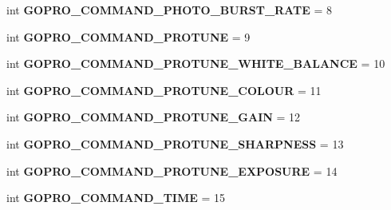 \begin{DoxyCompactItemize}
\item 
\mbox{\label{namespacepymavlink_1_1dialects_1_1v10_a2f48cf9475e0a0918864031cb02472fc}} 
int {\bfseries G\+O\+P\+R\+O\+\_\+\+C\+O\+M\+M\+A\+N\+D\+\_\+\+P\+H\+O\+T\+O\+\_\+\+B\+U\+R\+S\+T\+\_\+\+R\+A\+TE} = 8
\item 
\mbox{\label{namespacepymavlink_1_1dialects_1_1v10_a8d4dc474ba7d4efb758af7cd7c1598aa}} 
int {\bfseries G\+O\+P\+R\+O\+\_\+\+C\+O\+M\+M\+A\+N\+D\+\_\+\+P\+R\+O\+T\+U\+NE} = 9
\item 
\mbox{\label{namespacepymavlink_1_1dialects_1_1v10_af1d0b4e81e42e7d5d51eb76dc51d3e7b}} 
int {\bfseries G\+O\+P\+R\+O\+\_\+\+C\+O\+M\+M\+A\+N\+D\+\_\+\+P\+R\+O\+T\+U\+N\+E\+\_\+\+W\+H\+I\+T\+E\+\_\+\+B\+A\+L\+A\+N\+CE} = 10
\item 
\mbox{\label{namespacepymavlink_1_1dialects_1_1v10_a9ff3ad12bb0d8c7dec331da4e5ab4389}} 
int {\bfseries G\+O\+P\+R\+O\+\_\+\+C\+O\+M\+M\+A\+N\+D\+\_\+\+P\+R\+O\+T\+U\+N\+E\+\_\+\+C\+O\+L\+O\+UR} = 11
\item 
\mbox{\label{namespacepymavlink_1_1dialects_1_1v10_aa9d14f70049946355d0c56c5c44fdef5}} 
int {\bfseries G\+O\+P\+R\+O\+\_\+\+C\+O\+M\+M\+A\+N\+D\+\_\+\+P\+R\+O\+T\+U\+N\+E\+\_\+\+G\+A\+IN} = 12
\item 
\mbox{\label{namespacepymavlink_1_1dialects_1_1v10_a804271477da8a9f278bbc517c2f7a969}} 
int {\bfseries G\+O\+P\+R\+O\+\_\+\+C\+O\+M\+M\+A\+N\+D\+\_\+\+P\+R\+O\+T\+U\+N\+E\+\_\+\+S\+H\+A\+R\+P\+N\+E\+SS} = 13
\item 
\mbox{\label{namespacepymavlink_1_1dialects_1_1v10_af4c66cf423eaae3d043db7563ce7f7f2}} 
int {\bfseries G\+O\+P\+R\+O\+\_\+\+C\+O\+M\+M\+A\+N\+D\+\_\+\+P\+R\+O\+T\+U\+N\+E\+\_\+\+E\+X\+P\+O\+S\+U\+RE} = 14
\item 
\mbox{\label{namespacepymavlink_1_1dialects_1_1v10_a9c99d9ee588ea284261d2872f08d4b15}} 
int {\bfseries G\+O\+P\+R\+O\+\_\+\+C\+O\+M\+M\+A\+N\+D\+\_\+\+T\+I\+ME} = 15

\end{DoxyCompactItemize}

